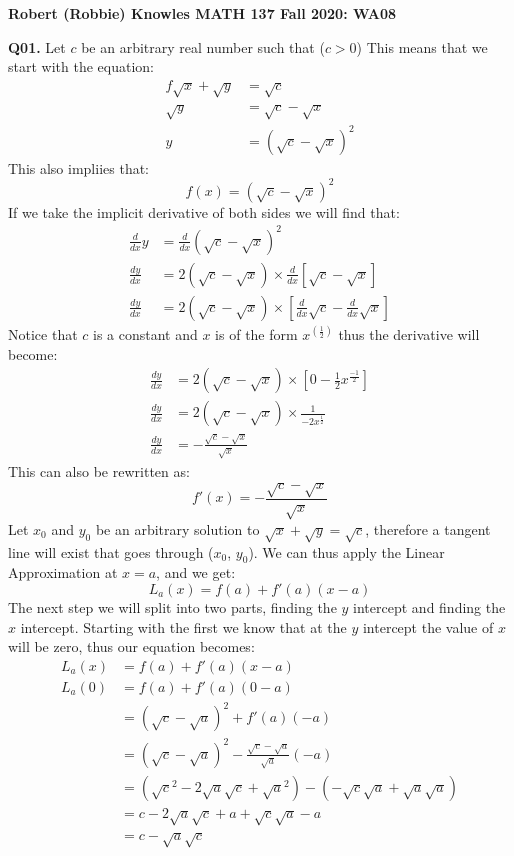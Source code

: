 \documentclass[11pt]{article}
\begin{document}
\parindent=0pt

\textbf{Robert (Robbie) Knowles MATH 137 Fall 2020: WA08}

\textbf{Q01.} Let $c$ be an arbitrary real number such that ($c > 0$) This means that we start with the equation:
\begin{align*}
f\sqrt{x} +  \sqrt{y} & = \sqrt{c}\\
 \sqrt{y} & = \sqrt{c}-\sqrt{x}\\
y & = (\sqrt{c}-\sqrt{x})^2
\end{align*}
This also impliies that:
\[ f(x) =  (\sqrt{c}-\sqrt{x})^2 \]
If we take the implicit derivative of both sides we will find that:
\begin{align*}
\frac{d}{dx}y & =\frac{d}{dx} (\sqrt{c}-\sqrt{x})^2 \\
\frac{dy}{dx} & =2(\sqrt{c}-\sqrt{x}) \times \frac{d}{dx} [\sqrt{c}-\sqrt{x}]\\
\frac{dy}{dx} & =2(\sqrt{c}-\sqrt{x}) \times [\frac{d}{dx}  \sqrt{c}- \frac{d}{dx} \sqrt{x}]
\end{align*}
Notice that $c$ is a constant and $x$ is of the form $x^{(\frac{1}{2})}$ thus the derivative will become:
\begin{align*}
\frac{dy}{dx} & =2(\sqrt{c}-\sqrt{x}) \times [0 - \frac{1}{2}x^{\frac{-1}{2}}]\\
\frac{dy}{dx} & =2(\sqrt{c}-\sqrt{x}) \times \frac{1}{-2x^\frac{1}{2}}\\
\frac{dy}{dx} & =-\frac{\sqrt{c}-\sqrt{x}}{\sqrt{x}}
\end{align*}
This can also be rewritten as:
\[ f'(x) = -\frac{\sqrt{c}-\sqrt{x}}{\sqrt{x}} \]
Let $x_0$ and $y_0$ be an arbitrary solution to $\sqrt{x} +  \sqrt{y} = \sqrt{c}$, therefore a tangent line will exist that goes through ($x_0$, $y_0$). We can thus apply the Linear Approximation at $x=a$, and we get:
\[ L_a(x) = f(a) + f'(a)(x-a) \]
The next step we will split into two parts, finding the $y$ intercept and finding the $x$ intercept. Starting with the first we know that at the $y$ intercept the value of $x$ will be zero, thus our equation becomes:
\begin{align*}
 L_a(x) & = f(a) + f'(a)(x-a)\\
 L_a(0) & = f(a) + f'(a)(0-a)\\
 & =(\sqrt{c}-\sqrt{a})^2 +f'(a)(-a)\\
 & =(\sqrt{c}-\sqrt{a})^2 - \frac{\sqrt{c}-\sqrt{a}}{\sqrt{a}}(-a)\\
 & =(\sqrt{c}^2 - 2\sqrt{a}\sqrt{c} + \sqrt{a}^2) - (-\sqrt{c}\sqrt{a}+\sqrt{a}\sqrt{a})\\
 & = c - 2\sqrt{a}\sqrt{c} + a +\sqrt{c}\sqrt{a} - a\\
 & = c - \sqrt{a}\sqrt{c}\\
\end{align*}
\end{document}
